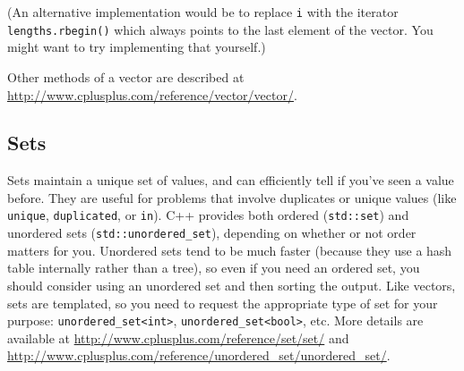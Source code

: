 \begin{Shaded}
\begin{Highlighting}[]
  


   \NormalTok{;}
   \NormalTok{prev = x[}\NormalTok{];}
  \NormalTok{);}

     
    \NormalTok{\} } \NormalTok{\{}
      \NormalTok{);}

    \NormalTok{\}}
  \NormalTok{\}}

   
    \NormalTok{_[}\NormalTok{] = lengths, }
    \NormalTok{_[}\NormalTok{] = values}
  \NormalTok{);}
\NormalTok{\}}
\end{Highlighting}
\end{Shaded}

(An alternative implementation would be to replace \texttt{i} with the
iterator \texttt{lengths.rbegin()} which always points to the last
element of the vector. You might want to try implementing that
yourself.)

Other methods of a vector are described at
\url{http://www.cplusplus.com/reference/vector/vector/}.

\subsection{Sets}

Sets maintain a unique set of values, and can efficiently tell if you've
seen a value before. They are useful for problems that involve
duplicates or unique values (like \texttt{unique}, \texttt{duplicated},
or \texttt{in}). C++ provides both ordered (\texttt{std::set}) and
unordered sets (\texttt{std::unordered\_set}), depending on whether or
not order matters for you. Unordered sets tend to be much faster
(because they use a hash table internally rather than a tree), so even
if you need an ordered set, you should consider using an unordered set
and then sorting the output. Like vectors, sets are templated, so you
need to request the appropriate type of set for your purpose:
\texttt{unordered\_set\textless{}int\textgreater{}},
\texttt{unordered\_set\textless{}bool\textgreater{}}, etc. More details
are available at \url{http://www.cplusplus.com/reference/set/set/} and
\url{http://www.cplusplus.com/reference/unordered_set/unordered_set/}.

